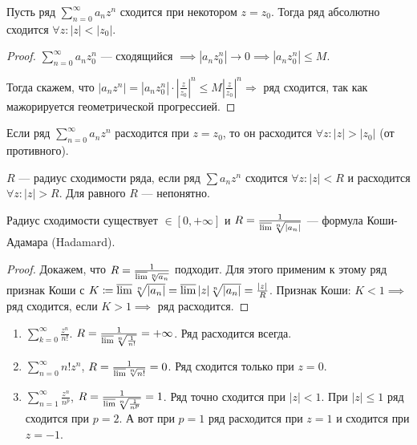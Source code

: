 \begin{theorem}
    Пусть ряд $\sum\limits_{n=0}^\infty a_nz^n$ сходится при некотором  $z = z_0$. Тогда ряд абсолютно сходится  $\forall z\!: |z| < |z_0|$.
\end{theorem}
\begin{proof}
    $\sum\limits_{n=0}^\infty a_n z_0^n$ --- сходящийся $\implies |a_nz_0^n| \to 0 \implies |a_nz_0^n| \le M$.

    Тогда скажем, что $|a_nz^n| = |a_nz_0^n| \cdot \left|\frac{z}{z_0}\right|^n \le M \left|\frac{z}{z_0}\right|^n \Rightarrow$ ряд сходится, так как мажорируется геометрической прогрессией.
\end{proof}
\begin{consequence}
    Если ряд $\sum\limits_{n=0}^\infty a_nz^n$ расходится при  $z=z_0$, то он расходится  $\forall z\!: |z| > |z_0|$ (от противного).
\end{consequence}
\begin{definition}
    $R$ --- радиус сходимости ряда, если ряд  $\sum a_nz^n$  сходится $\forall z\!: |z| < R$ и расходится  $\forall z\!: |z| > R$. Для равного $R$ --- непонятно.
\end{definition}
\begin{theorem}
    Радиус сходимости существует $\in [0, +\infty]$ и  $R = \frac{1}{\varlimsup \sqrt[n]{|a_n|}}$ --- формула Коши-Адамара (Hadamard).
\end{theorem}
\begin{proof}
    Докажем, что $R = \frac{1}{\varlimsup \sqrt[n]{a_n}}$ подходит. Для этого применим к этому ряд признак Коши с $K \coloneqq \varlimsup \sqrt[n]{|a_n|} = \varlimsup |z| \sqrt[n]{|a_n|} = \frac{|z|}{R}$. Признак Коши: $K < 1 \implies$ ряд сходится, если  $K > 1 \implies$ ряд расходится.
\end{proof}
\begin{example}
    \begin{enumerate}
        \item $\sum\limits_{k=0}^\infty \frac{z^n}{n!}$. $R = \frac{1}{\varlimsup \sqrt[n]{\frac{1}{n!}}} = +\infty$. Ряд расходится всегда.
        \item $\sum\limits_{n=0}^\infty n!z^n$,  $R = \frac{1}{\varlimsup \sqrt[n]{n!}} = 0$. Ряд сходится только при $z = 0$.
        \item  $\sum\limits_{n=1}^\infty \frac{z^n}{n^p}$, $R = \frac{1}{\varlimsup \sqrt[n]{\frac{1}{n^p}}} = 1$. Ряд точно сходится при $|z| < 1$. При  $|z| \le 1$ ряд сходится при $p = 2$. А вот при $p=1$ ряд расходится при  $z=1$ и сходится при  $z = -1$.
    \end{enumerate}
\end{example}
